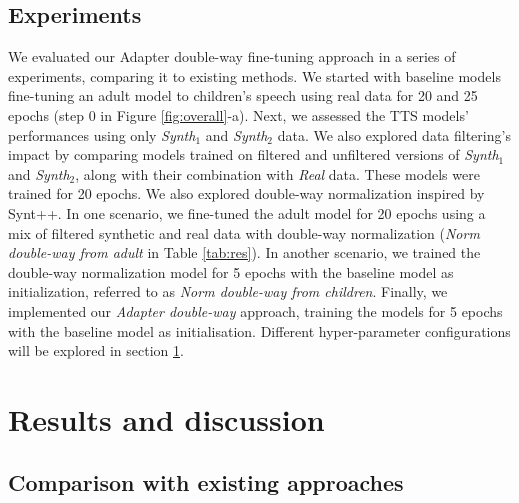 \subsection{Experiments}
We evaluated our Adapter double-way fine-tuning approach in a series of experiments, comparing it to existing methods. We started with baseline models fine-tuning an adult model to children's speech using real data for 20 and 25 epochs (step 0 in Figure \ref{fig:overall}-a).
Next, we assessed the TTS models' performances using only \textit{Synth$_1$} and \textit{Synth$_2$} data. We also explored data filtering's impact by comparing models trained on filtered and unfiltered versions of \textit{Synth$_1$} and \textit{Synth$_2$}, along with their combination with \textit{Real} data. These models were trained for 20 epochs.
We also explored double-way normalization inspired by Synt++. In one scenario, we fine-tuned the adult model for 20 epochs using a mix of filtered synthetic and real data with double-way normalization (\textit{Norm double-way from adult} in Table \ref{tab:res}). In another scenario, we trained the double-way normalization model for 5 epochs with the baseline model as initialization, referred to as \textit{Norm double-way from children}.
Finally, we implemented our \textit{Adapter double-way} approach, training the models for 5 epochs with the baseline model as initialisation. Different hyper-parameter configurations will be explored in section \ref{section:exp}.
\section{Results and discussion}
\label{section:exp}

\subsection{Comparison with existing approaches}


